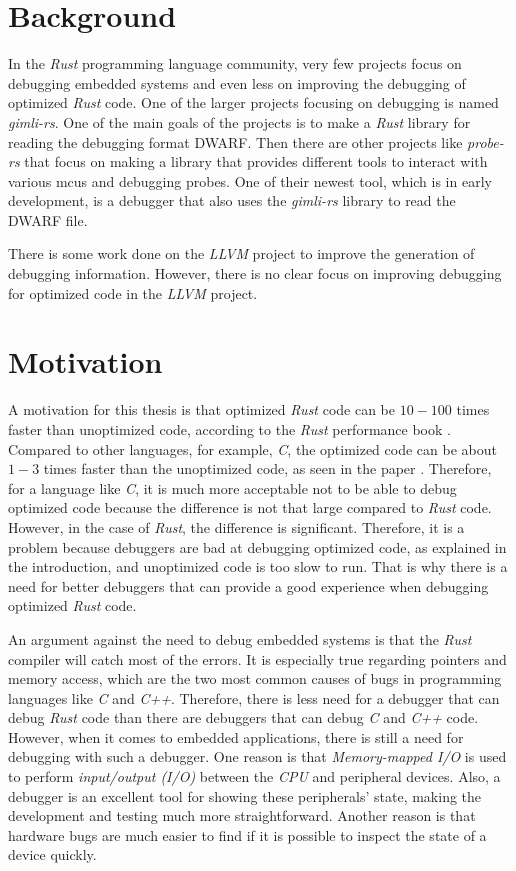 \section{Background}
In the \emph{Rust} programming language community, very few projects focus on debugging embedded systems and even less on improving the debugging of optimized \emph{Rust} code.
One of the larger projects focusing on debugging is named \emph{gimli-rs}.
One of the main goals of the projects is to make a \emph{Rust} library for reading the debugging format \gls{DWARF}.
Then there are other projects like \emph{probe-rs} that focus on making a library that provides different tools to interact with various \glspl{mcu} and debugging probes.
One of their newest tool, which is in early development, is a debugger that also uses the \emph{gimli-rs} library to read the DWARF file.


There is some work done on the \emph{LLVM} project to improve the generation of debugging information.
However, there is no clear focus on improving debugging for optimized code in the \emph{LLVM} project.


\section{Motivation}
A motivation for this thesis is that optimized \emph{Rust} code can be $10-100$ times faster than unoptimized code, according to the \emph{Rust} performance book \cite{perf-book}.
Compared to other languages, for example, \emph{C}, the optimized code can be about $1-3$ times faster than the unoptimized code, as seen in the paper \cite{clang-opt}.
Therefore, for a language like \emph{C}, it is much more acceptable not to be able to debug optimized code because the difference is not that large compared to \emph{Rust} code.
However, in the case of \emph{Rust}, the difference is significant.
Therefore, it is a problem because debuggers are bad at debugging optimized code, as explained in the introduction, and unoptimized code is too slow to run.
That is why there is a need for better debuggers that can provide a good experience when debugging optimized \emph{Rust} code.


An argument against the need to debug embedded systems is that the \emph{Rust} compiler will catch most of the errors.
It is especially true regarding pointers and memory access, which are the two most common causes of bugs in programming languages like \emph{C} and \emph{C++}.
Therefore, there is less need for a debugger that can debug \emph{Rust} code than there are debuggers that can debug \emph{C} and \emph{C++} code.
However, when it comes to embedded applications, there is still a need for debugging with such a debugger.
One reason is that \emph{Memory-mapped I/O} is used to perform \emph{input/output (I/O)} between the \emph{CPU} and peripheral devices.
Also, a debugger is an excellent tool for showing these peripherals' state, making the development and testing much more straightforward.
Another reason is that hardware bugs are much easier to find if it is possible to inspect the state of a device quickly.


